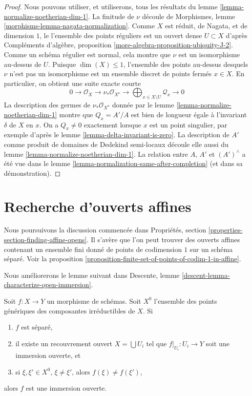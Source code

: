 \begin{proof}
Nous pouvons utiliser, et utiliserons, tous les résultats du
lemme \ref{lemma-normalize-noetherian-dim-1}.
La finitude de $\nu$ découle de
Morphismes, lemme \ref{morphisms-lemma-nagata-normalization}.
Comme $X$ est réduit, de Nagata, et de dimension $1$, le
l'ensemble des points réguliers est un ouvert dense $U \subset X$ d'après
Compléments d'algèbre, proposition \ref{more-algebra-proposition-ubiquity-J-2}.
Comme un schéma régulier est normal, cela montre que $\nu$
est un isomorphisme au-dessus de $U$.
Puisque $\dim(X) \leq 1$, l'ensemble des points au-dessus desquels $\nu$ n'est pas
un isomorphisme est un ensemble discret de points fermés $x \in X$.
En particulier, on obtient une suite exacte courte
$$
0 \to \mathcal{O}_X \to \nu_*\mathcal{O}_{X^\nu} \to
\bigoplus\nolimits_{x \in X \setminus U} \mathcal{Q}_x \to 0
$$
La description des germes de $\nu_*\mathcal{O}_{X^\nu}$
donnée par le lemme \ref{lemma-normalize-noetherian-dim-1} montre que
$Q_x = A'/A$ est bien de longueur égale à l'invariant $\delta$ de $X$ en $x$.
On a $Q_x \not = 0$ exactement lorsque $x$ est un point singulier, par
exemple d'après le lemme \ref{lemma-delta-invariant-is-zero}.
La description de $A'$ comme produit de domaines de Dedekind semi-locaux découle
elle aussi du lemme \ref{lemma-normalize-noetherian-dim-1}.
La relation entre $A$, $A'$ et $(A')^\wedge$
a été vue dans le lemme \ref{lemma-normalization-same-after-completion}
(et dans sa démonstration).
\end{proof}




\section{Recherche d'ouverts affines}
\label{section-finding-affine-opens}

\noindent
Nous poursuivons la discussion commencée dans
Propriétés, section \ref{properties-section-finding-affine-opens}.
Il s'avère que l'on peut trouver des ouverts affines contenant un ensemble fini donné
de points de codimension $1$ sur un schéma séparé. Voir
la proposition \ref{proposition-finite-set-of-points-of-codim-1-in-affine}.

\medskip\noindent
Nous améliorerons le lemme suivant dans
Descente, lemme \ref{descent-lemma-characterize-open-immersion}.

\begin{lemma}
\label{lemma-characterize-open-immersion}
Soit $f : X \to Y$ un morphisme de schémas. Soit $X^0$ l'ensemble
des points génériques des composantes irréductibles de $X$. Si
\begin{enumerate}
\item $f$ est séparé,
\item il existe un recouvrement ouvert $X = \bigcup U_i$ tel que
$f|_{U_i} : U_i \to Y$ soit une immersion ouverte, et
\item si $\xi, \xi' \in X^0$, $\xi \not = \xi'$, alors $f(\xi) \not = f(\xi')$,
\end{enumerate}
alors $f$ est une immersion ouverte.
\end{lemma}

